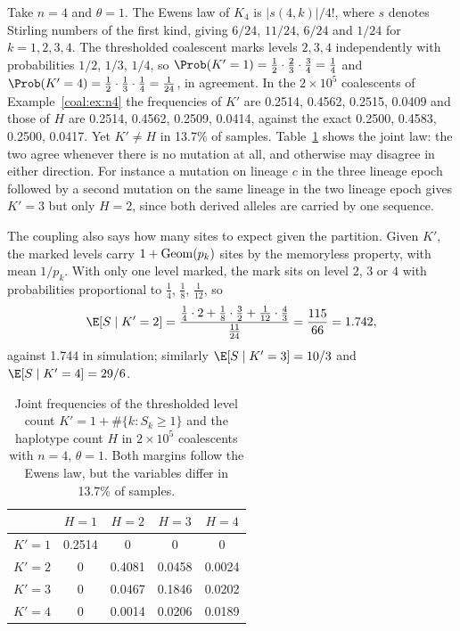 \begin{example}\label{coal:ex:coupling}
Take $n=4$ and $\theta=1$. The Ewens law of $K_4$ is $|s(4,k)|/4!$, where $s$ denotes Stirling numbers of the first kind, giving $6/24$, $11/24$, $6/24$ and $1/24$ for $k=1,2,3,4$. The thresholded coalescent marks levels $2,3,4$ independently with probabilities $1/2$, $1/3$, $1/4$, so $\Prob(K'=1)=\tfrac12\cdot\tfrac23\cdot\tfrac34=\tfrac14$ and $\Prob(K'=4)=\tfrac12\cdot\tfrac13\cdot\tfrac14=\tfrac1{24}$, in agreement. In the $2\times10^5$ coalescents of Example~\ref{coal:ex:n4} the frequencies of $K'$ are 0.2514, 0.4562, 0.2515, 0.0409 and those of $H$ are 0.2514, 0.4562, 0.2509, 0.0414, against the exact 0.2500, 0.4583, 0.2500, 0.0417. Yet $K'\ne H$ in 13.7\% of samples. Table~\ref{coal:tab:joint} shows the joint law: the two agree whenever there is no mutation at all, and otherwise may disagree in either direction. For instance a mutation on lineage $c$ in the three lineage epoch followed by a second mutation on the same lineage in the two lineage epoch gives $K'=3$ but only $H=2$, since both derived alleles are carried by one sequence.

The coupling also says how many sites to expect given the partition. Given $K'$, the marked levels carry $1+\mathrm{Geom}(p_k)$ sites by the memoryless property, with mean $1/p_k$. With only one level marked, the mark sits on level $2$, $3$ or $4$ with probabilities proportional to $\tfrac14$, $\tfrac18$, $\tfrac1{12}$, so
\[
\E[S\mid K'=2]=\frac{\tfrac14\cdot2+\tfrac18\cdot\tfrac32+\tfrac1{12}\cdot\tfrac43}{\tfrac{11}{24}}=\frac{115}{66}=1.742,
\]
against 1.744 in simulation; similarly $\E[S\mid K'=3]=10/3$ and $\E[S\mid K'=4]=29/6$.
\end{example}

\begin{table}[t]
\centering
\small
\begin{tabular}{ccccc}
\toprule
 & $H=1$ & $H=2$ & $H=3$ & $H=4$\\
\midrule
$K'=1$ & 0.2514 & 0 & 0 & 0\\
$K'=2$ & 0 & 0.4081 & 0.0458 & 0.0024\\
$K'=3$ & 0 & 0.0467 & 0.1846 & 0.0202\\
$K'=4$ & 0 & 0.0014 & 0.0206 & 0.0189\\
\bottomrule
\end{tabular}
\caption{Joint frequencies of the thresholded level count $K'=1+\#\{k:S_k\ge1\}$ and the haplotype count $H$ in $2\times10^5$ coalescents with $n=4$, $\theta=1$. Both margins follow the Ewens law, but the variables differ in 13.7\% of samples.}
\label{coal:tab:joint}
\end{table}

